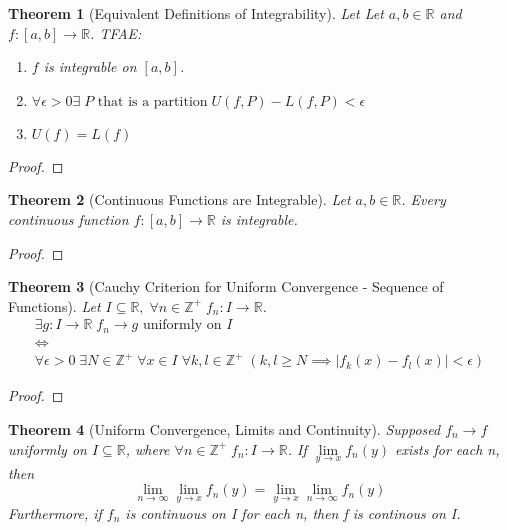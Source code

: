 \documentclass[11pt, oneside]{book}
\theoremstyle{break}
\newtheorem{thm}{Theorem}[section]
\newtheorem*{proof}{Proof}
\newcommand{\bb}[1]{\mathbb{#1}}			%
\begin{document}
\begin{thm}[Equivalent Definitions of Integrability]
	Let Let $a, b \in \bb{R}$ and $f: [a, b] \to \bb{R}$. TFAE:
	\begin{enumerate}
		\item $f$ is integrable on $[a, b]$.
		\item $\forall \epsilon > 0 \exists \; P \text{ that is a partition} \; U(f, P) - L(f, P) < \epsilon$
		\item $U(f) = L(f)$
	\end{enumerate}
\end{thm}

\begin{proof}
	
\end{proof}

\begin{thm}[Continuous Functions are Integrable]
	Let $a, b \in \bb{R}$. Every continuous function $f: [a, b] \to \bb{R}$ is integrable.
\end{thm}

\begin{proof}
	
\end{proof}

\begin{thm}[Cauchy Criterion for Uniform Convergence - Sequence of Functions]
	Let $I \subseteq \bb{R}, \; \forall n \in \bb{Z}^+ \; f_n: I \to \bb{R}$.
	\begin{gather*}
		\exists g: I \to \bb{R} \; f_n \to g \text{ uniformly on } I \\
		\iff \\
		\forall \epsilon > 0 \; \exists N \in \bb{Z}^+ \; \forall x \in I \; \forall k, l \in \bb{Z}^+ \; (k, l \geq N \implies |f_k(x) - f_l(x)| < \epsilon)
	\end{gather*}
\end{thm}

\begin{proof}
	
\end{proof}

\begin{thm}[Uniform Convergence, Limits and Continuity]
	Supposed $f_n \to f$ uniformly on $I \subseteq \bb{R}$, where $\forall n \in \bb{Z}^+ \; f_n: I \to \bb{R}$. If $\lim\limits_{y \to x} f_n(y)$ exists for each n, then
	\begin{equation*}
	 	\lim_{n \to \infty} \lim_{y \to x} f_n(y) = \lim_{y \to x} \lim_{n \to \infty} f_n(y)
	\end{equation*}
	Furthermore, if $f_n$ is continuous on I for each n, then f is continous on I.
\end{thm}
\end{document}
